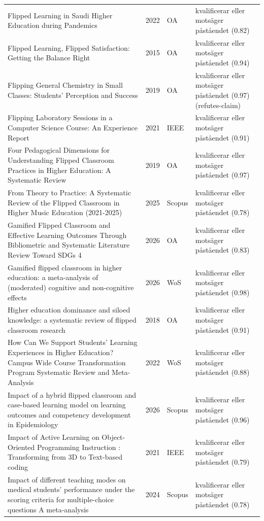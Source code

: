 \begin{longtable}{@{}%
  >{\raggedright\arraybackslash}p{}c%
  >{\raggedright\arraybackslash}p{}%
  >{\raggedright\arraybackslash}p{}@{}}
Flipped Learning in Saudi Higher Education during Pandemics & 2022 & OA & kvalificerar eller motsäger påståendet (0.82) \\
Flipped Learning, Flipped Satisfaction: Getting the Balance Right & 2015 & OA & kvalificerar eller motsäger påståendet (0.94) \\
Flipping General Chemistry in Small Classes: Students' Perception and Success & 2019 & OA & kvalificerar eller motsäger påståendet (0.97) (refutes-claim) \\
Flipping Laboratory Sessions in a Computer Science Course: An Experience Report & 2021 & IEEE & kvalificerar eller motsäger påståendet (0.91) \\
Four Pedagogical Dimensions for Understanding Flipped Classroom Practices in Higher Education: A Systematic Review & 2019 & OA & kvalificerar eller motsäger påståendet (0.97) \\
From Theory to Practice: A Systematic Review of the Flipped Classroom in Higher Music Education (2021-2025) & 2025 & Scopus & kvalificerar eller motsäger påståendet (0.78) \\
Gamified Flipped Classroom and Effective Learning Outcomes Through Bibliometric and Systematic Literature Review Toward SDGs 4 & 2026 & OA & kvalificerar eller motsäger påståendet (0.83) \\
Gamified flipped classroom in higher education: a meta-analysis of (moderated) cognitive and non-cognitive effects & 2026 & WoS & kvalificerar eller motsäger påståendet (0.98) \\
Higher education dominance and siloed knowledge: a systematic review of flipped classroom research & 2018 & OA & kvalificerar eller motsäger påståendet (0.91) \\
How Can We Support Students' Learning Experiences in Higher Education? Campus Wide Course Transformation Program Systematic Review and Meta-Analysis & 2022 & WoS & kvalificerar eller motsäger påståendet (0.88) \\
Impact of a hybrid flipped classroom and case-based learning model on learning outcomes and competency development in Epidemiology & 2026 & Scopus & kvalificerar eller motsäger påståendet (0.96) \\
Impact of Active Learning on Object-Oriented Programming Instruction : Transforming from 3D to Text-based coding & 2021 & IEEE & kvalificerar eller motsäger påståendet (0.79) \\
Impact of different teaching modes on medical students' performance under the scoring criteria for multiple-choice questions A meta-analysis & 2024 & Scopus & kvalificerar eller motsäger påståendet (0.78) \\

\end{longtable}
